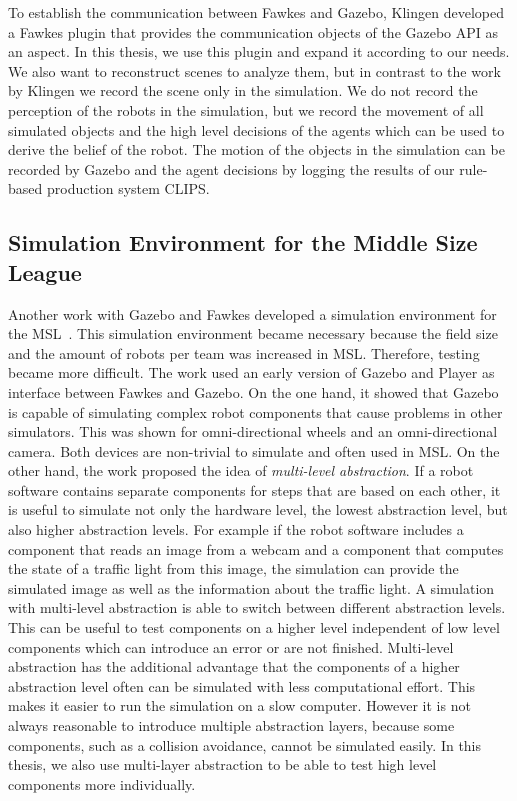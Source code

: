 To establish the communication between Fawkes and Gazebo, Klingen developed a Fawkes plugin that provides the communication objects of the Gazebo API as an aspect. In this thesis, we use this plugin and expand it according to our needs. We also want to reconstruct scenes to analyze them, but in contrast to the work by Klingen we record the scene only in the simulation. We do not record the perception of the robots in the simulation, but we record the movement of all simulated objects and the high level decisions of the agents which can be used to derive the belief of the robot. The motion of the objects in the simulation can be recorded by Gazebo and the agent decisions by logging the results of our rule-based production system CLIPS.

\subsection{Simulation Environment for the Middle Size League}
Another work with Gazebo and Fawkes developed a simulation environment for the MSL~\cite{MultiLevelAbstraction}. This simulation environment became necessary because the field size and the amount of robots per team was increased in MSL. Therefore, testing became more difficult. The work used an early version of Gazebo and Player as interface between Fawkes and Gazebo. On the one hand, it showed that Gazebo is capable of simulating complex robot components that cause problems in other simulators. This was shown for omni-directional wheels and an omni-directional camera. Both devices are non-trivial to simulate and often used in MSL. On the other hand, the work proposed the idea of \textit{multi-level abstraction}. If a robot software contains separate components for steps that are based on each other, it is useful to simulate not only the hardware level, the lowest abstraction level, but also higher abstraction levels. For example if the robot software includes a component that reads an image from a webcam and a component that computes the state of a traffic light from this image, the simulation can provide the simulated image as well as the information about the traffic light. A simulation with multi-level abstraction is able to switch between different abstraction levels. This can be useful to test components on a higher level independent of low level components which can introduce an error or are not finished. Multi-level abstraction has the additional advantage that the components of a higher abstraction level often can be simulated with less computational effort. This makes it easier to run the simulation on a slow computer. However it is not always reasonable to introduce multiple abstraction layers, because some components, such as a collision avoidance, cannot be simulated easily. In this thesis, we also use multi-layer abstraction to be able to test high level components more individually.



